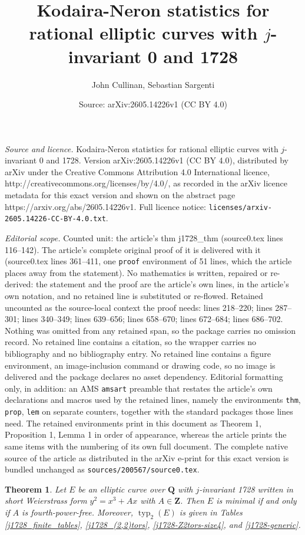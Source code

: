 \documentclass[10pt,a4paper]{amsart}
\title{Kodaira-Neron statistics for rational elliptic curves with $j$-invariant 0 and 1728}
\author{John Cullinan, Sebastian Sargenti}
\date{Source: arXiv:2605.14226v1 (CC BY 4.0)}
\newtheorem{thm}{Theorem}
\newcommand{\Q}{\mathbf{Q}}
\newcommand{\Z}{\mathbf{Z}}
\DeclareMathOperator{\typ}{{typ}}
\begin{document}
\maketitle

\noindent\emph{Source and licence.} Kodaira-Neron statistics for rational elliptic curves with $j$-invariant 0 and 1728. Version arXiv:2605.14226v1 (CC BY 4.0), distributed by arXiv under the Creative Commons Attribution 4.0 International licence, http://creativecommons.org/licenses/by/4.0/, as recorded in the arXiv licence metadata for this exact version and shown on the abstract page https://arxiv.org/abs/2605.14226v1. Full licence notice: \texttt{licenses/arxiv-2605.14226-CC-BY-4.0.txt}.\par\smallskip

\noindent\textit{Editorial scope.} Counted unit: the article's thm j1728\_thm (source0.tex lines 116--142). The article's complete original proof of it is delivered with it (source0.tex lines 361--411, one \texttt{proof} environment of 51 lines, which the article places away from the statement). No mathematics is written, repaired or re-derived: the statement and the proof are the article's own lines, in the article's own notation, and no retained line is substituted or re-flowed.  Retained uncounted as the source-local context the proof needs: lines 218--220; lines 287--301; lines 340--349; lines 639--656; lines 658--670; lines 672--684; lines 686--702.  Nothing was omitted from any retained span, so the package carries no omission record.  No retained line contains a citation, so the wrapper carries no bibliography and no bibliography entry.  No retained line contains a figure environment, an image-inclusion command or drawing code, so no image is delivered and the package declares no asset dependency.  Editorial formatting only, in addition: an AMS \texttt{amsart} preamble that restates the article's own declarations and macros used by the retained lines, namely the environments \texttt{thm}, \texttt{prop}, \texttt{lem} on separate counters, together with the standard packages those lines need.  The retained environments print in this document as Theorem 1, Proposition 1, Lemma 1 in order of appearance, whereas the article prints the same items with the numbering of its own full document.  The complete native source of the article as distributed in the arXiv e-print for this exact version is bundled unchanged as \texttt{sources/200567/source0.tex}.
\begin{thm} \label{1728_min_thm}
Let $E$ be an elliptic curve over $\Q$ with $j$-invariant 1728 written in short Weierstrass form $y^2 = x^3 + Ax$ with $A \in \Z$. Then $E$ is minimal if and only if  $A$ is fourth-power-free.  Moreover, $\typ_2(E)$ is given in Tables \ref{j1728_finite_tables}, \ref{j1728_(2,2)tors},  \ref{j1728-Z2tors-size4}, and \ref{j1728-generic}. 
\end{thm}
\end{document}

